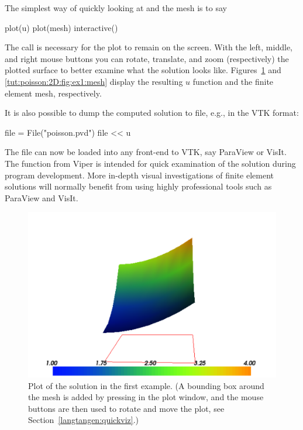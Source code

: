 The simplest way of quickly looking at  and the mesh is to say
\begin{python}
plot(u)
plot(mesh)
interactive()
\end{python}
The  call is necessary for the plot to remain on the
screen. With the left, middle, and right mouse buttons you can rotate,
translate, and zoom (respectively) the plotted surface to better examine
what the solution looks like.  Figures~\ref{tut:poisson:2D:fig:ex1:u}
and \ref{tut:poisson:2D:fig:ex1:mesh} display the resulting $u$ function
and the finite element mesh, respectively.

It is also possible to dump the computed solution to file, e.g., in the
VTK format:
\begin{python}
file = File("poisson.pvd")
file << u
\end{python}
The  file can now be loaded into any front-end to VTK,
say ParaView or VisIt. The  function from Viper is intended
for quick examination of the solution during program development.
More in-depth visual investigations of finite element solutions will
normally benefit from using highly professional tools such as ParaView
and VisIt.

\begin{figure}
  \centering
  \includegraphics[width=\largefig]{chapters/langtangen/pdf/ex1_u.pdf}
  \caption{Plot of the solution in the first \fenics{} example.
    (A bounding box around the mesh is added by pressing  in the plot
    window, and the mouse buttons are then used to rotate and move the
    plot, see Section~\ref{langtangen:quickviz}.)}
  \label{tut:poisson:2D:fig:ex1:u}
\end{figure}

